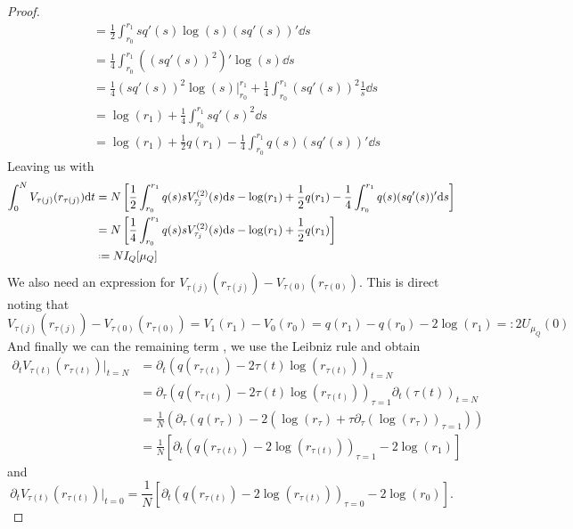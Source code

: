 \begin{proof}
\begin{align}
	&= \frac{1}{2} \int_{r_0}^{r_1} s q'(s) \log(s) (s q'(s))' \dd s \\
	& = \frac{1}{4} \int_{r_0}^{r_1} ((sq'(s))^2)' \log(s) \dd s \\
	& = \frac{1}{4} (s q'(s))^2 \log(s) |_{r_0}^{r_1} + \frac{1}{4}  \int_{r_0}^{r_1} (s q'(s))^2 \frac{1}{s} \dd s \\
	& = \log(r_1) + \frac{1}{4} \int_{r_0}^{r_1} s q'(s)^2 \dd s \\
	& = \log(r_1) + \frac{1}{2} q(r_1) - \frac{1}{4} \int_{r_0}^{r_1} q(s) (s q'(s))' \dd s
\end{align}
Leaving us with
\begin{align}
	\int_0^N V_{\tau(j)}(r_{\tau(j)})  \dd t & = N \left[\frac{1}{2} \int_{r_0}^{r_1} q(s) s V^{(2)}_{\tau_j}(s) \dd s - \log(r_1) + \frac{1}{2} q(r_1) - \frac{1}{4} \int_{r_0}^{r_1} q(s) (s q'(s))' \dd s \right]  \\
	& = N \left[\frac{1}{4} \int_{r_0}^{r_1} q(s) s V^{(2)}_{\tau_j}(s) \dd s- \log(r_1) + \frac{1}{2} q(r_1) \right]  \\
	& \deff N I_Q[\mu_Q]  
	\label{Equation: Equilibrium energy annulus}
\end{align}
We also need an expression for $ V_{\tau(j)}(r_{\tau(j)})  - V_{\tau(0)}(r_{\tau(0)})$. This is direct noting that
\begin{equation}
	V_{\tau(j)}(r_{\tau(j)})  - V_{\tau(0)}(r_{\tau(0)}) = V_1(r_1) - V_0(r_0) = q(r_1) - q(r_0) - 2 \log(r_1) =: 2 U_{\mu_Q}(0)
	\label{Equation: U function annulus}
\end{equation}
And finally we can the remaining term , we use the Leibniz rule and obtain
\begin{align}
	\partial_t V_{\tau(t)}(r_{\tau(t)})|_{t=N}	& = \partial_t \left( q(r_{\tau(t)}) - 2 \tau(t) \log(r_{\tau(t)}) \right)_{t=N} \\
	& = \partial_\tau \left( q(r_{\tau(t)}) - 2 \tau(t) \log(r_{\tau(t)}) \right)_{\tau=1} \partial_t \left( \tau(t) \right)_{t =N} \\
	& = \frac{1}{N} \left( \partial_\tau (q(r_{\tau})) - 2 \left( \log(r_{\tau}) + \tau \partial_\tau\left( \log(r_{\tau}) \right)_{\tau = 1} \right) \right) \\
	& = \frac{1}{N} \left[ \partial_t(q(r_{\tau(t)}) - 2 \log(r_{\tau(t)}))_{\tau=1} - 2 \log(r_1) \right] 
\end{align}
and
\begin{equation}
	\partial_t V_{\tau(t)}(r_{\tau(t)})|_{t=0} = \frac{1}{N} \left[ \partial_t(q(r_{\tau(t)}) - 2 \log(r_{\tau(t)}))_{\tau= 0} - 2 \log(r_0) \right].

\end{equation}
\end{proof}
